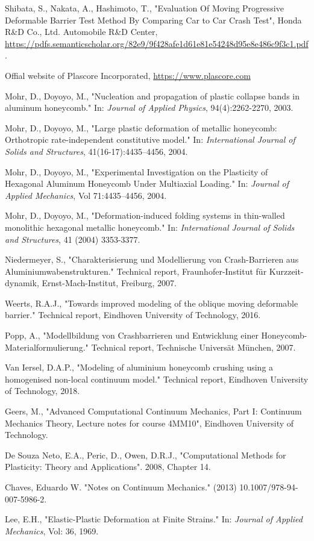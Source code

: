 \begin{thebibliography}{9}
Shibata, S., Nakata, A., Hashimoto, T., "Evaluation Of Moving Progressive Deformable Barrier Test Method By Comparing Car to Car Crash Test", Honda R\&D Co., Ltd. Automobile R\&D Center,  \url{https://pdfs.semanticscholar.org/82e9/9f428afe1d61e81e54248d95e8e486c9f3c1.pdf}.

Offial website of Plascore Incorporated, \url{https://www.plascore.com}

Mohr, D., Doyoyo, M., "Nucleation and propagation of plastic collapse bands in aluminum honeycomb." In: \textit{Journal of Applied Physics}, 94(4):2262-2270, 2003.

Mohr, D., Doyoyo, M., "Large plastic deformation of metallic honeycomb: Orthotropic rate-independent constitutive model." In: \textit{International Journal of Solids and Structures}, 41(16-17):4435–4456, 2004.

Mohr, D., Doyoyo, M., "Experimental Investigation on the Plasticity of Hexagonal Aluminum Honeycomb Under Multiaxial Loading." In: \textit{Journal of Applied Mechanics}, Vol 71:4435–4456, 2004.

Mohr, D., Doyoyo, M., "Deformation-induced folding systems in thin-walled monolithic hexagonal metallic honeycomb." In: \textit{International Journal of Solids and Structures}, 41 (2004) 3353-3377.

Niedermeyer, S., "Charakterisierung und Modellierung von Crash-Barrieren aus Aluminiumwabenstrukturen." Technical report, Fraunhofer-Institut für Kurzzeit-dynamik, Ernst-Mach-Institut, Freiburg, 2007.

Weerts, R.A.J., "Towards improved modeling of the oblique moving deformable barrier." Technical report, Eindhoven University of Technology, 2016.

Popp, A., "Modellbildung von Crashbarrieren und Entwicklung einer Honeycomb- Materialformulierung." Technical report, Technische Universät München, 2007.

Van Iersel, D.A.P., "Modeling of aluminium honeycomb crushing using a homogenised non-local continuum model." Technical report, Eindhoven University of Technology, 2018.

Geers, M., "Advanced Computational Continuum Mechanics, Part I: Continuum Mechanics Theory, Lecture notes for course 4MM10", Eindhoven University of Technology.

De Souza Neto, E.A., Peric, D., Owen, D.R.J., "Computational Methods for Plasticity: Theory and Applications". 2008, Chapter 14.

Chaves, Eduardo W. "Notes on Continuum Mechanics." (2013) 10.1007/978-94-007-5986-2. 

Lee, E.H., "Elastic-Plastic Deformation at Finite Strains." In: \textit{Journal of Applied Mechanics}, Vol: 36, 1969.

\end{thebibliography}